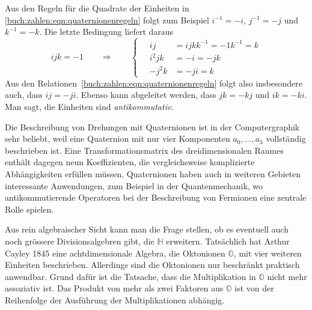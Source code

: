 Aus den Regeln für die Quadrate der Einheiten in
\eqref{buch:zahlen:eqn:quaternionenregeln} folgt zum Beispiel
$i^{-1}=-i$, $j^{-1}=-j$ und $k^{-1}=-k$.
Die letzte Bedingung liefert daraus
\[
ijk=-1
\qquad\Rightarrow\qquad
\left\{
\quad
\begin{aligned}
ij
&=
ijkk^{-1}=-1k^{-1}=k
\\
i^2jk&=-i=-jk
\\
-j^2k&=-ji=k
\end{aligned}
\right.
\]
Aus den Relationen~\eqref{buch:zahlen:eqn:quaternionenregeln}
folgt also insbesondere auch, dass $ij=-ji$.
Ebenso kann abgeleitet werden, dass $jk=-kj$ und $ik=-ki$.
Man sagt, die Einheiten sind {\em antikommutativ}.
%

Die Beschreibung von Drehungen mit Quaternionen ist in der
Computergraphik sehr beliebt, weil eine Quaternion mit nur vier
Komponenten $a_0,\dots,a_3$ vollständig beschrieben ist.
Eine Transformationsmatrix des dreidimensionalen Raumes enthält
dagegen neun Koeffizienten, die vergleichsweise komplizierte 
Abhängigkeiten erfüllen müssen.
Quaternionen haben auch in weiteren Gebieten interessante Anwendungen,
zum Beispiel in der Quantenmechanik, wo antikommutierende Operatoren
bei der Beschreibung von Fermionen eine zentrale Rolle spielen.

Aus rein algebraischer Sicht kann man die Frage stellen, ob es eventuell
auch noch grössere Divisionsalgebren gibt, die $\mathbb{H}$ erweitern.
Tatsächlich hat Arthur Cayley 1845 eine achtdimensionale Algebra,
die Oktonionen $\mathbb{O}$, mit vier weiteren Einheiten beschrieben.
%
Allerdings sind die Oktonionen nur beschränkt praktisch anwendbar.
Grund dafür ist die Tatsache, dass die Multiplikation in $\mathbb{O}$
nicht mehr assoziativ ist.
Das Produkt von mehr als zwei Faktoren aus $\mathbb{O}$ ist von der
Reihenfolge der Ausführung der Multiplikationen abhängig.






